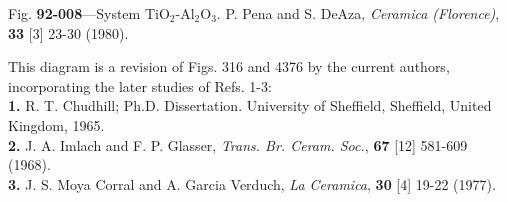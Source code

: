 \documentclass[addpoints,12pt,answers]{exam}
\begin{document}
Fig. \textbf{92-008}—System TiO$_2$-Al$_2$O$_3$.
P. Pena and S. DeAza, \textit{Ceramica (Florence)}, \textbf{33} [3] 23-30 (1980).

This diagram is a revision of Figs. 316 and 4376 by the current authors, incorporating the later studies of Refs. 1-3:\\

\textbf{1.} R. T. Chudhill; Ph.D. Dissertation. University of Sheffield, Sheffield, United Kingdom, 1965.\\

\textbf{2.} J. A. Imlach and F. P. Glasser, \textit{Trans. Br. Ceram. Soc.}, \textbf{67} [12] 581-609 (1968).\\

\textbf{3.} J. S. Moya Corral and A. Garcia Verduch, \textit{La Ceramica}, \textbf{30} [4] 19-22 (1977).\\
\end{document}
